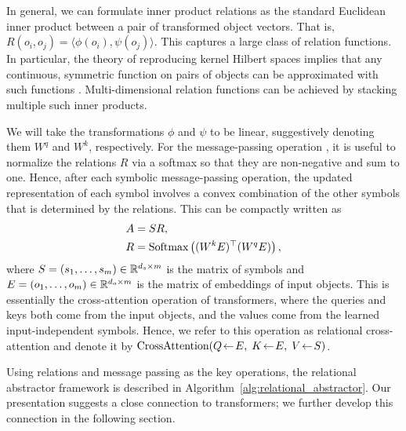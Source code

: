 In general, we can formulate inner product relations as the standard Euclidean inner product between a pair of transformed object vectors. That is, $R(o_i, o_j) = \langle \phi(o_i), \psi(o_j) \rangle$. This captures a large class of relation functions. In particular, the theory of reproducing kernel Hilbert spaces implies that any continuous, symmetric function on pairs of objects can be approximated with such functions
\citep{universal}. Multi-dimensional relation functions can be achieved by stacking multiple such inner products.

We will take the transformations $\phi$ and $\psi$ to be linear, suggestively denoting them $W^q$ and $W^k$, respectively. For the message-passing operation , it is useful to normalize the relations $R$ via a softmax so that they are non-negative and sum to one. Hence, after each symbolic message-passing operation, the updated representation of each symbol involves a convex combination of the other symbols that is determined by the relations. This can be compactly written as
\begin{equation}
    \label{eq:relational_crossattention}
    \begin{split}
        A &= S R, \\
        R &= \Softmax\left((W^k E)^\top (W^q E)\right),
    \end{split}
\end{equation}
where $S = (s_1, \ldots, s_m) \in \mathbb{R}^{d_s \times m}$ is the matrix of symbols and $E
= (o_1, \ldots, o_m) \in \mathbb{R}^{d_o \times m}$ is the matrix of embeddings of input objects. This is essentially the cross-attention operation of transformers, where the queries and keys both come from the input objects, and the values come from the learned input-independent symbols. Hence, we refer to this operation as relational cross-attention and denote it by $\mbox{CrossAttention}(Q\!\leftarrow\!E,\; K\!\leftarrow\!E,\; V\!\leftarrow\!S)$. %

Using relations and message passing as the key operations, the relational abstractor
framework is described in Algorithm~\ref{alg:relational_abstractor}. Our presentation suggests
a close connection to transformers; we further develop this connection in the following section.





% 

